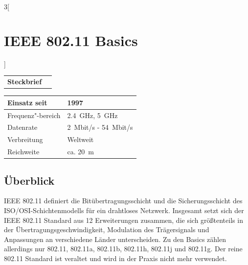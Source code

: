 \begin{multicols}{3}[\section{IEEE 802.11 Basics}]


\newrefsegment

\begin{boxedminipage}{\linewidth}
\begin{tabular}{p{}p{2.7 cm}}
\textbf{Steckbrief}& \\
\end{tabular}
\begin{tabular}{p{}|p{2.7 cm}}
      Einsatz seit & 1997\\
      \hline
      Frequenz"-bereich  & \SI{2.4}{\giga\hertz}, \SI{5}{\giga\hertz} \\
      \hline
      Datenrate & \SI{2}{Mbit/s} - \SI{54}{Mbit/s}\\
      \hline
       Verbreitung & Weltweit\\
      \hline
      Reichweite & ca. \SI{20}{\metre}\\
\end{tabular}
\end{boxedminipage}
\par
\subsection*{Überblick}

IEEE 802.11 definiert die Bitübertragungsschicht und die Sicherungsschicht des ISO/OSI-Schichtenmodells für ein drahtloses Netzwerk.
Insgesamt setzt sich der IEEE 802.11 Standard aus 12 Erweiterungen zusammen, die sich größtenteils in der  Übertragungsgeschwindigkeit,  Modulation des Trägersignals und Anpassungen an verschiedene Länder unterscheiden. Zu den Basics zählen allerdings nur 802.11, 802.11a, 802.11b, 802.11h, 802.11j und 802.11g. 
Der reine 802.11 Standard ist veraltet und wird in der Praxis nicht mehr verwendet.



\end{multicols}
